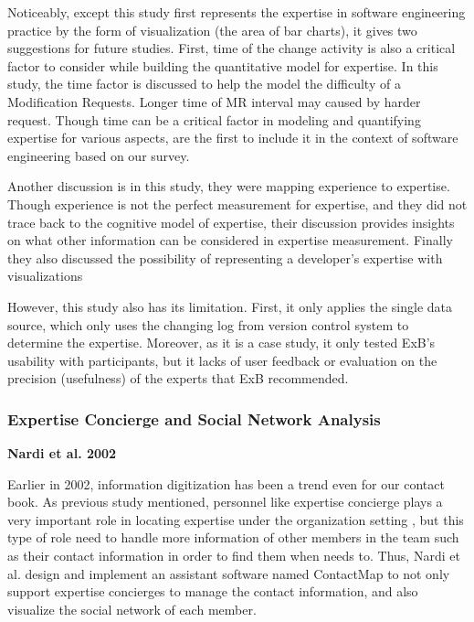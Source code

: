 Noticeably, except this study first represents the expertise in software engineering practice by the form of visualization (the area of bar charts), it gives two suggestions for future studies. First, time of the change activity is also a critical factor to consider while building the quantitative model for expertise. In this study, the time factor is discussed to help the model the difficulty of a Modification Requests. Longer time of MR interval may caused by harder request. Though time can be a critical factor in modeling and quantifying expertise for various aspects, \citeauthor{mockus2002expertise} are the first to include it in the context of software engineering based on our survey.

Another discussion is in this study, they were mapping experience to expertise. Though experience is not the perfect measurement for expertise, and they did not trace back to the cognitive model of expertise, their discussion provides insights on what other information can be considered in expertise measurement. Finally they also discussed the possibility of representing a developer's expertise with visualizations 

However, this study also has its limitation. First, it only applies the single data source, which only uses the changing log from version control system to determine the expertise. Moreover, as it is a case study, it only tested ExB's usability with participants, but it lacks of user feedback or evaluation on the precision (usefulness) of the experts that ExB recommended.

\subsubsection{Expertise Concierge and Social Network Analysis}

\textbf{Nardi et al. 2002}

Earlier in 2002, information digitization has been a trend even for our contact book. As previous study mentioned, personnel like expertise concierge plays a very important role in locating expertise under the organization setting \cite{mcdonald1998just}, but this type of role need to handle more information of other members in the team such as their contact information in order to find them when needs to. Thus, Nardi et al. design and implement an assistant software named ContactMap \cite{nardi2002integrating} to not only support expertise concierges to manage the contact information, and also visualize the social network of each member.

